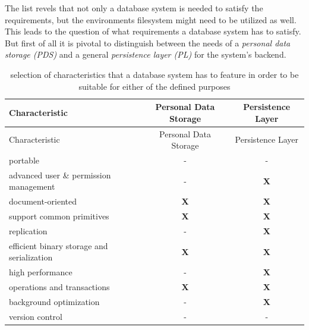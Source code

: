 \documentclass[12pt,english,a4paper,titlepage,cleardoublepage=empty,dottedtoc]{report}
\begin{document}
The list revels that not only a database system is needed to satisfy the
requirements, but the environments filesystem might need to be utilized
as well. This leads to the question of what requirements a database
system has to satisfy. But first of all it is pivotal to distinguish
between the needs of a \emph{personal data storage (PDS)} and a general
\emph{persistence layer (PL)} for the system's backend.

\begin{longtable}[]{@{}lcc@{}}
\caption{selection of characteristics that a database system has to
feature in order to be suitable for either of the defined purposes
\label{tbl:dbs-features}}\tabularnewline
\toprule
Characteristic & Personal Data Storage & Persistence
Layer\tabularnewline
\midrule
\endfirsthead
\toprule
Characteristic & Personal Data Storage & Persistence
Layer\tabularnewline
\midrule
\endhead
portable & - & -\tabularnewline
advanced user \& permission management & - & \textbf{X}\tabularnewline
document-oriented & \textbf{X} & \textbf{X}\tabularnewline
support common primitives & \textbf{X} & \textbf{X}\tabularnewline
replication & - & \textbf{X}\tabularnewline
efficient binary storage and serialization & \textbf{X} &
\textbf{X}\tabularnewline
high performance & - & \textbf{X}\tabularnewline
operations and transactions & \textbf{X} & \textbf{X}\tabularnewline
background optimization & - & \textbf{X}\tabularnewline
version control & - & -\tabularnewline
\bottomrule
\end{longtable}
\end{document}
